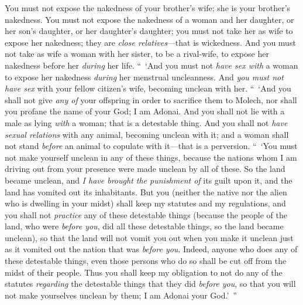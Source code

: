 \begin{biblechapter}
\verse You must not expose the nakedness of your brother’s wife; she is your brother’s nakedness.
\verse You must not expose the nakedness of a woman and her daughter, or her son’s daughter, or her daughter’s daughter; you must not take her as wife to expose her nakedness; they are \textit{close relatives}—that is wickedness.
\verse And you must not take as wife a woman with her sister, to be a rival-wife, to expose her nakedness before her \textit{during} her life.
\verse “ ‘And you must not \textit{have sex with} a woman to expose her nakedness \textit{during} her menstrual uncleanness.
\verse And \textit{you must not have sex} with your fellow citizen’s wife, becoming unclean with her.
\verse “ ‘And you shall not give \textit{any of} your offspring in order to sacrifice them to Molech, nor shall you profane the name of your God; I am Adonai.
\verse And you shall not lie with a male as lying \textit{with} a woman; that is a detestable thing.
\verse And you shall not \textit{have sexual relations} with any animal, becoming unclean with it; and a woman shall not stand \textit{before} an animal to copulate with it—that is a perversion.
\verse “ ‘You must not make yourself unclean in any of these things, because the nations whom I am driving out from your presence were made unclean by all of these.
\verse So the land became unclean, and \textit{I have brought the punishment of} its guilt upon it, and the land has vomited out its inhabitants.
\verse But you (neither the native nor the alien who is dwelling in your midst) shall keep my statutes and my regulations, and you shall not \textit{practice} any of these detestable things
\verse (because the people of the land, who were \textit{before you}, did all these detestable things, so the land became unclean),
\verse so that the land will not vomit you out when you make it unclean just as it vomited out the nation that was \textit{before you}.
\verse Indeed, anyone who does any of these detestable things, even those persons who do so shall be cut off from the midst of their people.
\verse Thus you shall keep my obligation to not do any of the statutes \textit{regarding} the detestable things that they did \textit{before you}, so that you will not make yourselves unclean by them; I am Adonai your God.’ ”
\end{biblechapter}

